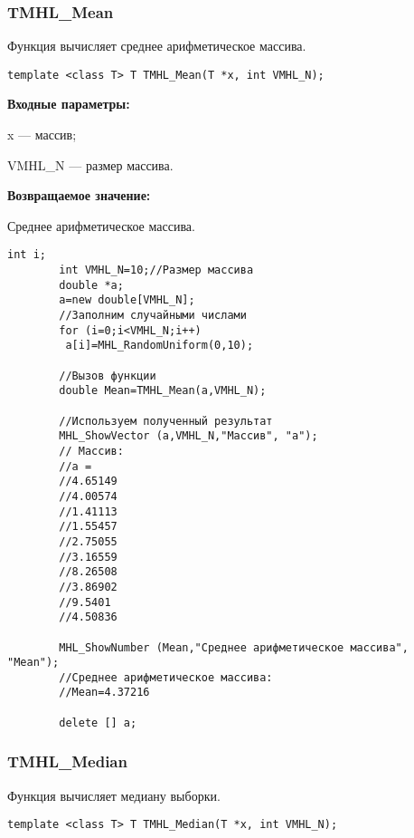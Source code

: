 \documentclass[a4paper,12pt]{article}
\begin{document}
\subsubsection{TMHL\_Mean}\label{TMHL_Mean}

Функция вычисляет среднее арифметическое массива.


\begin{lstlisting}[label=code_syntax_TMHL_Mean,caption=Синтаксис]
template <class T> T TMHL_Mean(T *x, int VMHL_N);
\end{lstlisting}

\textbf{Входные параметры:}

 x --- массив;
 
 VMHL\_N --- размер массива.

\textbf{Возвращаемое значение:}

 Среднее арифметическое массива.



\begin{lstlisting}[label=code_use_TMHL_Mean,caption=Пример использования]
        int i;
        int VMHL_N=10;//Размер массива
        double *a;
        a=new double[VMHL_N];
        //Заполним случайными числами
        for (i=0;i<VMHL_N;i++)
         a[i]=MHL_RandomUniform(0,10);

        //Вызов функции
        double Mean=TMHL_Mean(a,VMHL_N);

        //Используем полученный результат
        MHL_ShowVector (a,VMHL_N,"Массив", "a");
        // Массив:
        //a =
        //4.65149
        //4.00574
        //1.41113
        //1.55457
        //2.75055
        //3.16559
        //8.26508
        //3.86902
        //9.5401
        //4.50836

        MHL_ShowNumber (Mean,"Среднее арифметическое массива", "Mean");
        //Среднее арифметическое массива:
        //Mean=4.37216

        delete [] a;
\end{lstlisting}

\subsubsection{TMHL\_Median}\label{TMHL_Median}

Функция вычисляет медиану выборки.


\begin{lstlisting}[label=code_syntax_TMHL_Median,caption=Синтаксис]
template <class T> T TMHL_Median(T *x, int VMHL_N);
\end{lstlisting}
\end{document}
